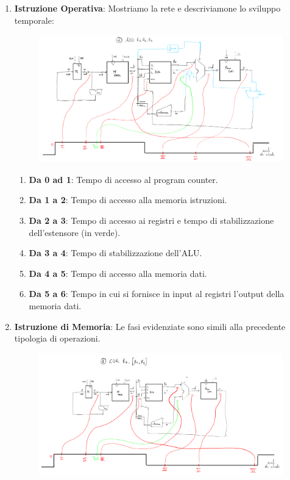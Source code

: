 \documentclass{article}
\begin{document}
\begin{enumerate}
    \item \textbf{Istruzione Operativa}: Mostriamo la rete e descriviamone lo sviluppo temporale:
    
    \begin{figure}[htbp]
        \center
        \includegraphics[scale=0.23]{img/reteOp.png}
    \end{figure}

    \begin{enumerate}
        \item \textbf{Da 0 ad 1}: Tempo di accesso al program counter.
        \item \textbf{Da 1 a 2}: Tempo di accesso alla memoria istruzioni.
        \item \textbf{Da 2 a 3}: Tempo di accesso ai registri e tempo di stabilizzazione dell'estensore (in verde).
        \item \textbf{Da 3 a 4}: Tempo di stabilizzazione dell'ALU.
        \item \textbf{Da 4 a 5}: Tempo di accesso alla memoria dati.
        \item \textbf{Da 5 a 6}: Tempo in cui si fornisce in input al registri l'output della memoria dati.
    \end{enumerate}

\newpage

\item \textbf{Istruzione di Memoria}: Le fasi evidenziate sono simili alla precedente tipologia di operazioni.

    \begin{figure}[htbp]
        \center
        \includegraphics[scale=0.23]{img/reteMem.png}
    \end{figure}


\end{enumerate}
\end{document}
